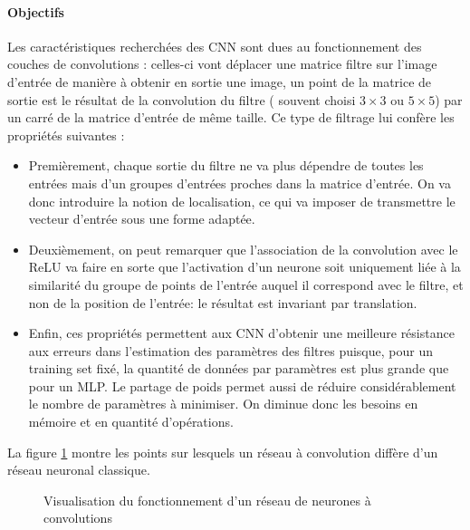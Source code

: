 \documentclass[
    10pt,
    a4paper,
    oneside,
    headinclude,footinclude,
    BCOR=5mm,
    captions=tableabove
]{scrartcl}
\begin{document}
\paragraph{Objectifs}
Les caractéristiques recherchées des CNN sont dues au fonctionnement des couches de convolutions : celles-ci vont déplacer une matrice filtre sur l'image d'entrée de manière à obtenir en sortie une image, un point de la matrice de sortie est le résultat de la convolution du filtre ( souvent choisi $3\times3$ ou $5\times5$) par un carré de la matrice d'entrée de même taille.
Ce type de filtrage lui confère les propriétés suivantes :
\begin{itemize}
	\item Premièrement, chaque sortie du filtre ne va plus dépendre de toutes les entrées mais d'un groupes d'entrées proches dans la matrice d'entrée. On va donc introduire la notion de localisation, ce qui va imposer de transmettre le vecteur d'entrée sous une forme adaptée.
	\item Deuxièmement, on peut remarquer que l'association de la convolution avec le ReLU va faire en sorte que l'activation d'un neurone soit uniquement liée à la similarité du groupe de points de l'entrée auquel il correspond avec le filtre, et non de la position de l'entrée: le résultat est invariant par translation.
	\item Enfin, ces propriétés permettent aux CNN d'obtenir une meilleure résistance aux erreurs dans l'estimation des paramètres des filtres puisque, pour un training set fixé, la quantité de données par paramètres est plus grande que pour un MLP. Le partage de poids permet aussi de réduire considérablement le nombre de paramètres à minimiser. On diminue donc les besoins en mémoire et en quantité d'opérations.
\end{itemize}
La figure \ref{fig:CNN.png} montre les points sur lesquels un réseau à convolution diffère d'un réseau neuronal classique.

\begin{figure}[h!]
\centering
{}
\caption{Visualisation du fonctionnement d'un réseau de neurones à convolutions}
\label{fig:CNN.png}
\end{figure}
\end{document}
